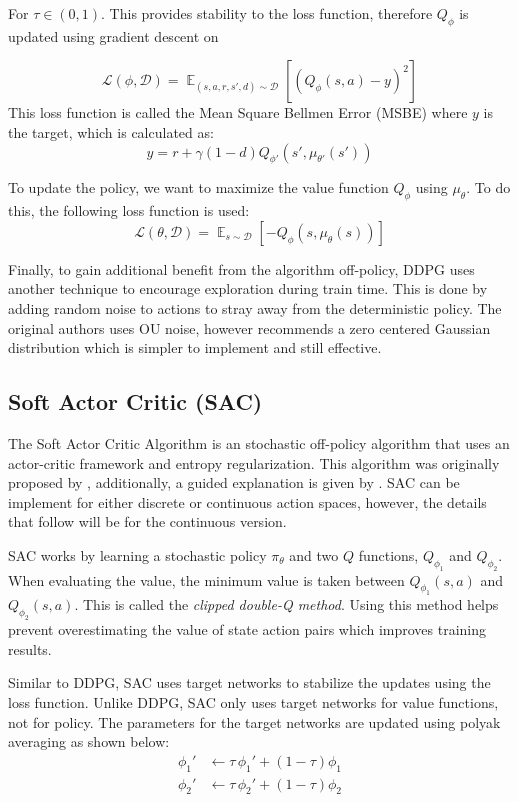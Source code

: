 \documentclass[conference]{IEEEtran}
\begin{document}
\begin{flushleft}
    For $\tau \in (0, 1)$. This provides stability to the loss function, therefore $Q_\phi$ is updated using gradient descent on
\end{flushleft}

$$
    \mathcal{L}(\phi, \mathcal{D}) = \mathop{\mathbb{E}}_{(s,a,r,s',d) \sim \mathcal{D}}\left[\left(Q_\phi(s,a) - y\right)^2\right]
$$
This loss function is called the Mean Square Bellmen Error (MSBE) where $y$ is the target, which is calculated as:
$$
    y = r + \gamma(1-d)Q_{\phi'}(s', \mu_{\theta'}(s'))
$$

To update the policy, we want to maximize the value function $Q_\phi$ using $\mu_\theta$. To do this, the following loss function is used:
$$
    \mathcal{L}(\theta, \mathcal{D}) = \mathop{\mathbb{E}}_{s \sim \mathcal{D}}\left[-Q_\phi(s, \mu_\theta(s))\right]
$$

Finally, to gain additional benefit from the algorithm off-policy, DDPG uses another technique to encourage exploration during train time. This is done by adding random noise to actions to stray away from the deterministic policy. The original authors uses OU noise, however \cite{spinning_up_ddpg} recommends a zero centered Gaussian distribution which is simpler to implement and still effective.

\subsection{Soft Actor Critic (SAC)}

The Soft Actor Critic Algorithm is an stochastic off-policy algorithm that uses an actor-critic framework and entropy regularization. This algorithm was originally proposed by \cite{SAC1, SAC2}, additionally, a guided explanation is given by \cite{spinning_up_sac}. SAC can be implement for either discrete or continuous action spaces, however, the details that follow will be for the continuous version.

SAC works by learning a stochastic policy $\pi_\theta$ and two $Q$ functions, $Q_{\phi_1}$ and $Q_{\phi_2}$.  When evaluating the value, the minimum value is taken between $Q_{\phi_1}(s, a)$ and $Q_{\phi_2}(s, a)$. This is called the \textit{clipped double-Q method}. Using this method helps prevent overestimating the value of state action pairs which improves training results.

Similar to DDPG, SAC uses target networks to stabilize the updates using the loss function. Unlike DDPG, SAC only uses target networks for value functions, not for policy. The parameters for the target networks are updated using polyak averaging as shown below:
\begin{align*}
    \phi_1' & \leftarrow \tau \, \phi_1' + (1 - \tau) \phi_1 \\
    \phi_2' & \leftarrow \tau \, \phi_2' + (1 - \tau) \phi_2
\end{align*}
\end{document}
